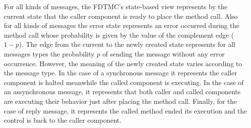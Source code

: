 For all kinds of messages, the FDTMC's state-based view represents by the
current state that the caller component is ready to place the method call. Also
for all kinds of messages the error state represents an error occurred during
the method call whose probability is given by the value of the complement edge
($1-p$). The edge from the current to the newly created state represents for all
messages types the probability $p$ of sending the message without any error
occurrence. However, the meaning of the newly created state varies according to
the message type. In the case of a synchronous message it represents the caller
component is halted meanwhile the called component is executing. In the case of
an assynchronous message, it represents that both caller and called components
are executing their behavior just after placing the method call. Finally, for
the case of reply message, it represents the called method ended its execution
and the control is back to the caller component. 

